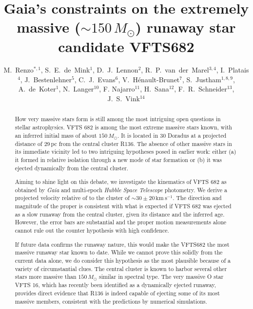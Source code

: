 \documentclass[apjl,twocolumn]{emulateapj}
\newcommand{\kms}{{\,\mathrm{km\ s^{-1}}}}
\begin{document}
\title{Gaia's constraints on the extremely massive  ($\sim$$150\,M_\odot$) runaway star candidate VFTS682}

\author{M.~Renzo$^{*,1}$, S.~E.~de~Mink$^{1}$, D.~J.~Lennon$^{2}$,
  R.~P.~van~der~Marel$^{3,4}$, I.~Platais$^{4}$, 
  J.~Bestenlehner$^{5}$, C.~J.~Evans$^{6}$,
  V.~H\'enault-Brunet$^{7}$,  S.~Justham$^{1,8,9}$,  A.~de~Koter$^{1}$,
  N.~Langer$^{10}$, F. Najarro$^{11}$, H.~Sana$^{12}$, F.~R.~Schneider$^{13}$, J.~S.~Vink$^{14}$}

\begin{abstract}
 
 How very massive stars form is still among the most intriguing open  questions in stellar astrophysics.  VFTS 682 is among the most  extreme massive stars known, with an inferred initial mass of about  $150\,M_\odot$. It is located in 30 Doradus at a projected distance of 29\,pc from the central cluster R136.  The absence of other massive stars in its immediate vicinity led to two intriguing hypotheses posed in earlier work: either (a) it formed in relative isolation through a new mode of star formation or (b) it was ejected dynamically from the central cluster. 
 
Aiming to shine light on this debate, we investigate the kinematics of  VFTS 682 as obtained by \emph{Gaia} and multi-epoch \emph{Hubble Space Telescope} photometry.    We derive a projected velocity relative of to the cluster of $\sim$$30\pm20\kms$.  The direction and magnitude of the proper is consistent with what is expected if VFTS 682 was ejected as a slow runaway from the central cluster, given its distance and the inferred age.  However, the error bars are substantial and the proper motion measurements alone cannot rule out the counter hypothesis with high confidence.   
 
If future data confirms the runaway nature, this would make the VFTS682 the most massive runaway star known to date.  While we cannot prove this solidly from the current data alone, we do consider this hypothesis as the most plausible because of a variety of circumstantial clues. The central cluster is known to harbor several other stars more massive than $150\,M_\odot$ similar in spectral type.  The very massive O star VFTS 16, which has recently been identified as a dynamically ejected runaway, provides direct evidence that R136 is indeed capable of ejecting some of its most massive members, consistent with the predictions by numerical simulations.
\end{abstract}
\end{document}
